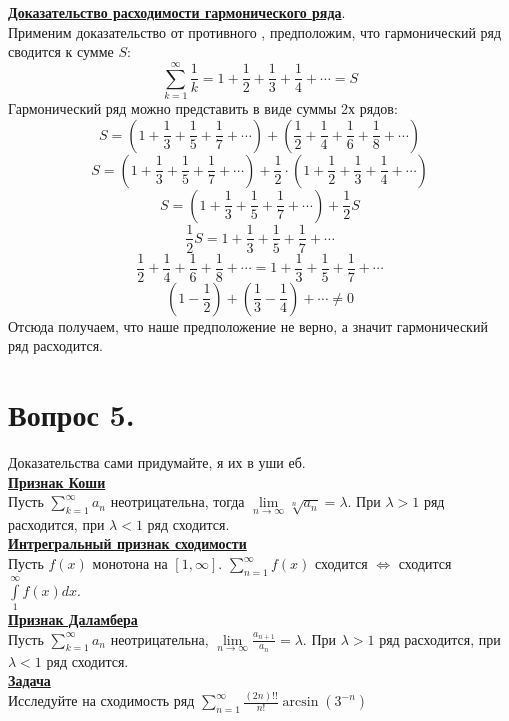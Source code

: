 \documentclass{report}
\begin{document}
\textbf{\uline{Доказательство расходимости гармонического ряда}}.\\
Применим доказательство от противного , предположим, что гармонический ряд сводится к сумме $S$:
$$\sum\limits_{k = 1}^\infty \frac{1}{k} = 1 + \frac{1}{2} + \frac{1}{3} + \frac{1}{4} + \cdots = S$$
Гармонический ряд можно представить в виде суммы 2х рядов:
$$S = (1 + \frac{1}{3} + \frac{1}{5} + \frac{1}{7} + \cdots) + (\frac{1}{2} + \frac{1}{4} + \frac{1}{6} + \frac{1}{8} + \cdots)$$
$$S = (1 + \frac{1}{3} + \frac{1}{5} + \frac{1}{7} + \cdots) + \frac{1}{2} \cdot (1 + \frac{1}{2} + \frac{1}{3} + \frac{1}{4} + \cdots)$$
$$S = (1 + \frac{1}{3} + \frac{1}{5} + \frac{1}{7} + \cdots) + \frac{1}{2}S$$
$$\frac{1}{2}S = 1 + \frac{1}{3} + \frac{1}{5} + \frac{1}{7} + \cdots$$
$$\frac{1}{2} + \frac{1}{4} + \frac{1}{6} + \frac{1}{8} + \cdots = 1 + \frac{1}{3} + \frac{1}{5} + \frac{1}{7} + \cdots$$
$$(1 - \frac{1}{2}) + (\frac{1}{3} - \frac{1}{4}) + \cdots \ne 0$$
Отсюда получаем, что наше предположение не верно, а значит гармонический ряд расходится.

\newpage
\section{Вопрос 5.}
Доказательства сами придумайте, я их в уши еб.\\

\textbf{\uline{Признак Коши}}\\
Пусть $\sum\limits_{k = 1}^\infty a_n$ неотрицательна, тогда $\lim\limits_{n \to \infty} \sqrt[n]{a_n} = \lambda$. При $\lambda > 1$ ряд расходится, при $\lambda < 1$ ряд сходится.\\

\textbf{\uline{Интрегральный признак сходимости}}\\
Пусть $f(x)$ монотона на $[1, \infty]$. $\sum\limits_{n = 1}^\infty f(x)$ сходится $\Leftrightarrow$ сходится $\int\limits_{1}^\infty f(x) dx$.\\

\textbf{\uline{Признак Даламбера}}\\
Пусть $\sum\limits_{k = 1}^\infty a_n$ неотрицательна, $\lim\limits_{n \to \infty} \frac{a_{n+1}}{a_n} = \lambda$. При $\lambda > 1$ ряд расходится, при $\lambda < 1$ ряд сходится.\\

\textbf{\uline{Задача}}\\
Исследуйте на сходимость ряд $\sum\limits_{n = 1}^\infty \frac{(2n)!!}{n!} \arcsin{(3^{-n})}$
\end{document}
